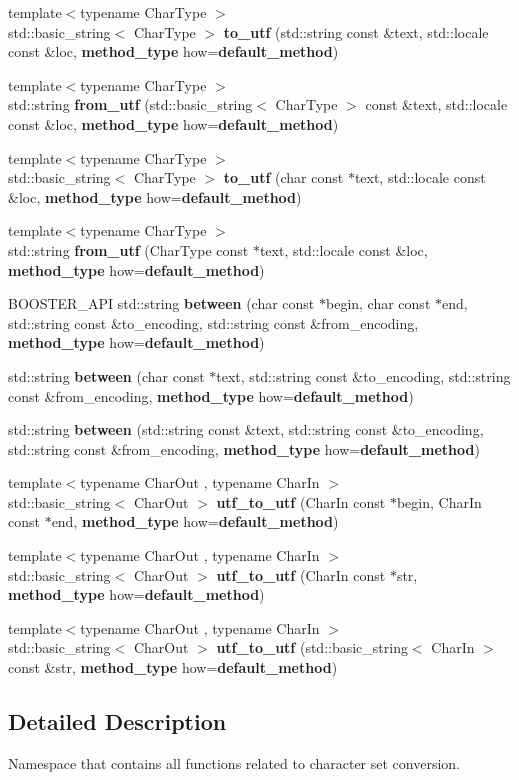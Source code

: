 \begin{DoxyCompactItemize}
\item 
{\footnotesize template$<$typename Char\+Type $>$ }\\std\+::basic\+\_\+string$<$ Char\+Type $>$ {\bf to\+\_\+utf} (std\+::string const \&text, std\+::locale const \&loc, {\bf method\+\_\+type} how={\bf default\+\_\+method})
\item 
{\footnotesize template$<$typename Char\+Type $>$ }\\std\+::string {\bf from\+\_\+utf} (std\+::basic\+\_\+string$<$ Char\+Type $>$ const \&text, std\+::locale const \&loc, {\bf method\+\_\+type} how={\bf default\+\_\+method})
\item 
{\footnotesize template$<$typename Char\+Type $>$ }\\std\+::basic\+\_\+string$<$ Char\+Type $>$ {\bf to\+\_\+utf} (char const $\ast$text, std\+::locale const \&loc, {\bf method\+\_\+type} how={\bf default\+\_\+method})
\item 
{\footnotesize template$<$typename Char\+Type $>$ }\\std\+::string {\bf from\+\_\+utf} (Char\+Type const $\ast$text, std\+::locale const \&loc, {\bf method\+\_\+type} how={\bf default\+\_\+method})
\item 
B\+O\+O\+S\+T\+E\+R\+\_\+\+A\+PI std\+::string {\bf between} (char const $\ast$begin, char const $\ast$end, std\+::string const \&to\+\_\+encoding, std\+::string const \&from\+\_\+encoding, {\bf method\+\_\+type} how={\bf default\+\_\+method})
\item 
std\+::string {\bf between} (char const $\ast$text, std\+::string const \&to\+\_\+encoding, std\+::string const \&from\+\_\+encoding, {\bf method\+\_\+type} how={\bf default\+\_\+method})
\item 
std\+::string {\bf between} (std\+::string const \&text, std\+::string const \&to\+\_\+encoding, std\+::string const \&from\+\_\+encoding, {\bf method\+\_\+type} how={\bf default\+\_\+method})
\item 
{\footnotesize template$<$typename Char\+Out , typename Char\+In $>$ }\\std\+::basic\+\_\+string$<$ Char\+Out $>$ {\bf utf\+\_\+to\+\_\+utf} (Char\+In const $\ast$begin, Char\+In const $\ast$end, {\bf method\+\_\+type} how={\bf default\+\_\+method})
\item 
{\footnotesize template$<$typename Char\+Out , typename Char\+In $>$ }\\std\+::basic\+\_\+string$<$ Char\+Out $>$ {\bf utf\+\_\+to\+\_\+utf} (Char\+In const $\ast$str, {\bf method\+\_\+type} how={\bf default\+\_\+method})
\item 
{\footnotesize template$<$typename Char\+Out , typename Char\+In $>$ }\\std\+::basic\+\_\+string$<$ Char\+Out $>$ {\bf utf\+\_\+to\+\_\+utf} (std\+::basic\+\_\+string$<$ Char\+In $>$ const \&str, {\bf method\+\_\+type} how={\bf default\+\_\+method})
\end{DoxyCompactItemize}


\subsection{Detailed Description}
Namespace that contains all functions related to character set conversion. 